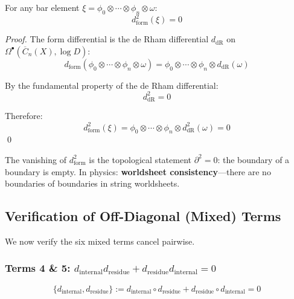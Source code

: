 \begin{proposition}\label{prop:d-form-squared}
For any bar element $\xi = \phi_0 \otimes \cdots \otimes \phi_n \otimes \omega$:
$$d_{\text{form}}^2(\xi) = 0$$
\end{proposition}

\begin{proof}
The form differential is the de Rham differential $d_{\text{dR}}$ on
$\Omega^{\bullet}(\overline{C}_n(X), \log D)$:
$$d_{\text{form}}(\phi_0 \otimes \cdots \otimes \phi_n \otimes \omega) = 
\phi_0 \otimes \cdots \otimes \phi_n \otimes d_{\text{dR}}(\omega)$$

By the fundamental property of the de Rham differential:
$$d_{\text{dR}}^2 = 0$$

Therefore:
$$d_{\text{form}}^2(\xi) = \phi_0 \otimes \cdots \otimes \phi_n \otimes 
d_{\text{dR}}^2(\omega) = 0$$
\qed
\end{proof}

\begin{remark}
The vanishing of $d_{\text{form}}^2$ is the topological statement $\partial^2 = 0$:
the boundary of a boundary is empty. In physics: \textbf{worldsheet consistency}---there
are no boundaries of boundaries in string worldsheets.
\end{remark}

\subsection{Verification of Off-Diagonal (Mixed) Terms}

We now verify the six mixed terms cancel pairwise.

\subsubsection{Terms 4 \& 5: $d_{\text{internal}} d_{\text{residue}} + 
d_{\text{residue}} d_{\text{internal}} = 0$}

\begin{proposition}\label{prop:int-res-anticomm}
$$\{d_{\text{internal}}, d_{\text{residue}}\} := d_{\text{internal}} \circ 
d_{\text{residue}} + d_{\text{residue}} \circ d_{\text{internal}} = 0$$
\end{proposition}

